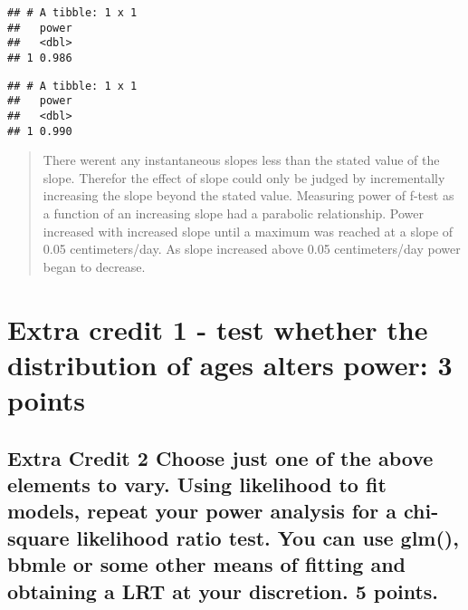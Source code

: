 \documentclass[]{article}
\newenvironment{Shaded}{\begin{snugshade}}{\end{snugshade}}
\newcommand{\KeywordTok}[1]{\textcolor[rgb]{0.13,0.29,0.53}{\textbf{#1}}}
\newcommand{\DataTypeTok}[1]{\textcolor[rgb]{0.13,0.29,0.53}{#1}}
\newcommand{\DecValTok}[1]{\textcolor[rgb]{0.00,0.00,0.81}{#1}}
\newcommand{\FloatTok}[1]{\textcolor[rgb]{0.00,0.00,0.81}{#1}}
\newcommand{\StringTok}[1]{\textcolor[rgb]{0.31,0.60,0.02}{#1}}
\newcommand{\OperatorTok}[1]{\textcolor[rgb]{0.81,0.36,0.00}{\textbf{#1}}}
\newcommand{\NormalTok}[1]{#1}
\begin{document}
\begin{verbatim}
## # A tibble: 1 x 1
##   power
##   <dbl>
## 1 0.986
\end{verbatim}

\begin{Shaded}
\end{Shaded}

\begin{verbatim}
## # A tibble: 1 x 1
##   power
##   <dbl>
## 1 0.990
\end{verbatim}

\begin{quote}
There werent any instantaneous slopes less than the stated value of the
slope. Therefor the effect of slope could only be judged by
incrementally increasing the slope beyond the stated value. Measuring
power of f-test as a function of an increasing slope had a parabolic
relationship. Power increased with increased slope until a maximum was
reached at a slope of 0.05 centimeters/day. As slope increased above
0.05 centimeters/day power began to decrease.
\end{quote}

\section{Extra credit 1 - test whether the distribution of ages alters
power: 3
points}\label{extra-credit-1---test-whether-the-distribution-of-ages-alters-power-3-points}

\subsection{Extra Credit 2 Choose just one of the above elements to
vary. Using likelihood to fit models, repeat your power analysis for a
chi-square likelihood ratio test. You can use glm(), bbmle or some other
means of fitting and obtaining a LRT at your discretion. 5
points.}\label{extra-credit-2-choose-just-one-of-the-above-elements-to-vary.-using-likelihood-to-fit-models-repeat-your-power-analysis-for-a-chi-square-likelihood-ratio-test.-you-can-use-glm-bbmle-or-some-other-means-of-fitting-and-obtaining-a-lrt-at-your-discretion.-5-points.}
\end{document}
